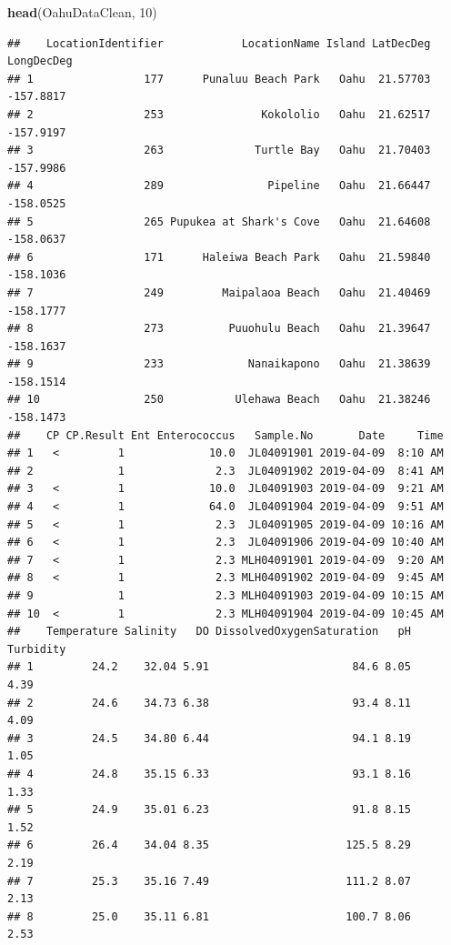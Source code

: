 \documentclass[12pt,]{article}
\newenvironment{Shaded}{\begin{snugshade}}{\end{snugshade}}
\newcommand{\KeywordTok}[1]{\textcolor[rgb]{0.13,0.29,0.53}{\textbf{#1}}}
\newcommand{\DecValTok}[1]{\textcolor[rgb]{0.00,0.00,0.81}{#1}}
\newcommand{\NormalTok}[1]{#1}
\begin{document}
\begin{Shaded}
\begin{Highlighting}[]
\KeywordTok{head}\NormalTok{(OahuDataClean, }\DecValTok{10}\NormalTok{)}
\end{Highlighting}
\end{Shaded}

\begin{verbatim}
##    LocationIdentifier            LocationName Island LatDecDeg LongDecDeg
## 1                 177      Punaluu Beach Park   Oahu  21.57703  -157.8817
## 2                 253               Kokololio   Oahu  21.62517  -157.9197
## 3                 263              Turtle Bay   Oahu  21.70403  -157.9986
## 4                 289                Pipeline   Oahu  21.66447  -158.0525
## 5                 265 Pupukea at Shark's Cove   Oahu  21.64608  -158.0637
## 6                 171      Haleiwa Beach Park   Oahu  21.59840  -158.1036
## 7                 249         Maipalaoa Beach   Oahu  21.40469  -158.1777
## 8                 273          Puuohulu Beach   Oahu  21.39647  -158.1637
## 9                 233             Nanaikapono   Oahu  21.38639  -158.1514
## 10                250           Ulehawa Beach   Oahu  21.38246  -158.1473
##    CP CP.Result Ent Enterococcus   Sample.No       Date     Time
## 1   <         1             10.0  JL04091901 2019-04-09  8:10 AM
## 2             1              2.3  JL04091902 2019-04-09  8:41 AM
## 3   <         1             10.0  JL04091903 2019-04-09  9:21 AM
## 4   <         1             64.0  JL04091904 2019-04-09  9:51 AM
## 5   <         1              2.3  JL04091905 2019-04-09 10:16 AM
## 6   <         1              2.3  JL04091906 2019-04-09 10:40 AM
## 7   <         1              2.3 MLH04091901 2019-04-09  9:20 AM
## 8   <         1              2.3 MLH04091902 2019-04-09  9:45 AM
## 9             1              2.3 MLH04091903 2019-04-09 10:15 AM
## 10  <         1              2.3 MLH04091904 2019-04-09 10:45 AM
##    Temperature Salinity   DO DissolvedOxygenSaturation   pH Turbidity
## 1         24.2    32.04 5.91                      84.6 8.05      4.39
## 2         24.6    34.73 6.38                      93.4 8.11      4.09
## 3         24.5    34.80 6.44                      94.1 8.19      1.05
## 4         24.8    35.15 6.33                      93.1 8.16      1.33
## 5         24.9    35.01 6.23                      91.8 8.15      1.52
## 6         26.4    34.04 8.35                     125.5 8.29      2.19
## 7         25.3    35.16 7.49                     111.2 8.07      2.13
## 8         25.0    35.11 6.81                     100.7 8.06      2.53

\end{verbatim}
\end{document}
